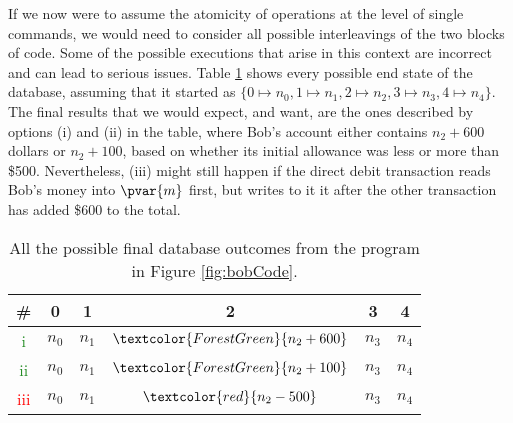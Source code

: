 If we now were to assume the atomicity of operations at the level of single commands, we would need to consider all possible interleavings of the two blocks of code. Some of the possible executions that arise in this context are incorrect and can lead to serious issues. Table \ref{table:bankOutcome} shows every possible end state of the database, assuming that it started as $\{ 0 \mapsto n_0, 1 \mapsto n_1, 2 \mapsto n_2, 3 \mapsto n_3, 4 \mapsto n_4 \}$. The final results that we would expect, and want, are the ones described by options (i) and (ii) in the table, where Bob's account either contains $n_2 + 600$ dollars or $n_2 + 100$, based on whether its initial allowance was less or more than \$500. Nevertheless, (iii) might still happen if the direct debit transaction reads Bob's money into $\pvar{m}$ first, but writes to it it after the other transaction has added \$$600$ to the total.

\bgroup
\setlength{\tabcolsep}{1.5em}
\def\arraystretch{1.5}
\begin{table}[h]
	\centering
	\caption{All the possible final database outcomes from the program in Figure \ref{fig:bobCode}.}
	\label{table:bankOutcome}
	\begin{tabular}{|c|c|c|c|c|c|}
	\hline
	\textbf{\#} & \textbf{0}         & \textbf{1}         & \textbf{2}         & \textbf{3}         & \textbf{4}         \\ \hline
	\textcolor{ForestGreen}{i}   & $n_0 $ & $n_1 $ & $\textcolor{ForestGreen}{n_2 + 600}$     & $n_3 $ & $n_4 $ \\ \hline
	\textcolor{ForestGreen}{ii}  & $n_0 $ & $n_1 $ & $\textcolor{ForestGreen}{n_2 + 100}$ & $n_3 $ & $n_4 $ \\ \hline
	\textcolor{red}{iii} & $n_0 $ & $n_1 $ & $\textcolor{red}{n_2 - 500}$  & $n_3 $ & $n_4 $ \\ \hline
	\end{tabular}
\end{table}
\egroup

